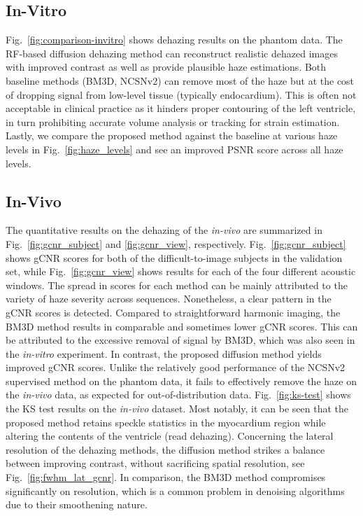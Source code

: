 \subsection{In-Vitro}
\label{sec:res-invitro}
Fig.~\ref{fig:comparison-invitro} shows dehazing results on the phantom data. The RF-based diffusion dehazing method can reconstruct realistic dehazed images with improved contrast as well as provide plausible haze estimations. Both baseline methods (BM3D, NCSNv2) can remove most of the haze but at the cost of dropping signal from low-level tissue (typically endocardium). \color{black} This is often not acceptable in clinical practice as it hinders proper contouring of the left ventricle, in turn prohibiting accurate volume analysis or tracking for strain estimation. Lastly, we compare the proposed method against the baseline at various haze levels in Fig.~\ref{fig:haze_levels} and see an improved PSNR score across all haze levels.
\subsection{In-Vivo}
\color{black}
\label{sec:res-invivo}
The quantitative results on the dehazing of the \emph{in-vivo} are summarized in Fig.~\ref{fig:gcnr_subject} and \ref{fig:gcnr_view}, respectively. Fig.~\ref{fig:gcnr_subject} shows gCNR scores for both of the difficult-to-image subjects in the validation set, while Fig.~\ref{fig:gcnr_view} shows results for each of the four different acoustic windows. The spread in scores for each method can be mainly attributed to the variety of haze severity across sequences. Nonetheless, a clear pattern in the gCNR scores is detected. Compared to straightforward harmonic imaging, the BM3D method results in comparable and sometimes lower gCNR scores. This can be attributed to the excessive removal of signal by BM3D, which was also seen in the \emph{in-vitro} experiment. In contrast, the proposed diffusion method yields improved gCNR scores. Unlike the relatively good performance of the NCSNv2 supervised method on the phantom data, it fails to effectively remove the haze on the \emph{in-vivo} data, as expected for out-of-distribution data. Fig.~\ref{fig:ks-test} shows the KS test results on the \emph{in-vivo} dataset. Most notably, it can be seen that the proposed method retains speckle statistics in the myocardium region while altering the contents of the ventricle (read dehazing). Concerning the lateral resolution of the dehazing methods, the diffusion method strikes a balance between improving contrast, without sacrificing spatial resolution, see Fig.~\ref{fig:fwhm_lat_gcnr}. In comparison, the BM3D method compromises significantly on resolution, which is a common problem in denoising algorithms due to their smoothening nature.


